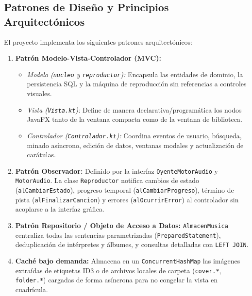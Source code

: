 \documentclass[12pt,a4paper]{article}
\begin{document}
\subsection{Patrones de Diseño y Principios Arquitectónicos}
El proyecto implementa los siguientes patrones arquitectónicos:
\begin{enumerate}
    \item \textbf{Patrón Modelo-Vista-Controlador (MVC):}
    \begin{itemize}
        \item \textit{Modelo (\texttt{nucleo} y \texttt{reproductor}):} Encapsula las entidades de dominio, la persistencia SQL y la máquina de reproducción sin referencias a controles visuales.
        \item \textit{Vista (\texttt{Vista.kt}):} Define de manera declarativa/programática los nodos JavaFX tanto de la ventana compacta como de la ventana de biblioteca.
        \item \textit{Controlador (\texttt{Controlador.kt}):} Coordina eventos de usuario, búsqueda, minado asíncrono, edición de datos, ventanas modales y actualización de carátulas.
    \end{itemize}
    \item \textbf{Patrón Observador:} Definido por la interfaz \texttt{OyenteMotorAudio} y \texttt{MotorAudio}. La clase \texttt{Reproductor} notifica cambios de estado (\texttt{alCambiarEstado}), progreso temporal (\texttt{alCambiarProgreso}), término de pista (\texttt{alFinalizarCancion}) y errores (\texttt{alOcurrirError}) al controlador sin acoplarse a la interfaz gráfica.
    \item \textbf{Patrón Repositorio / Objeto de Acceso a Datos:} \texttt{AlmacenMusica} centraliza todas las sentencias parametrizadas (\texttt{PreparedStatement}), deduplicación de intérpretes y álbumes, y consultas detalladas con \texttt{LEFT JOIN}.
    \item \textbf{Caché bajo demanda:} Almacena en un \texttt{ConcurrentHashMap} las imágenes extraídas de etiquetas ID3 o de archivos locales de carpeta (\texttt{cover.*}, \texttt{folder.*}) cargadas de forma asíncrona para no congelar la vista en cuadrícula.
\end{enumerate}
\end{document}
